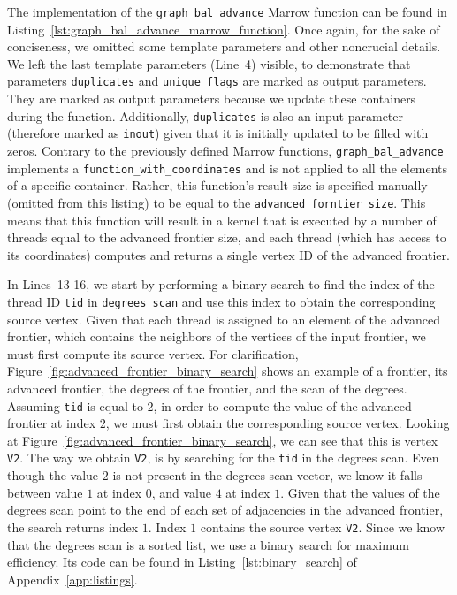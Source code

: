 The implementation of the \texttt{graph\_bal\_advance} Marrow function can be found in Listing~\ref{lst:graph_bal_advance_marrow_function}. Once again, for the sake of conciseness, we omitted some template parameters and other noncrucial details. We left the last template parameters (Line~4) visible, to demonstrate that parameters \texttt{duplicates} and \texttt{unique\_flags} are marked as output parameters. They are marked as output parameters because we update these containers during the function. Additionally, \texttt{duplicates} is also an input parameter (therefore marked as \texttt{inout}) given that it is initially updated to be filled with zeros. Contrary to the previously defined Marrow functions, \texttt{graph\_bal\_advance} implements a \texttt{function\_with\_coordinates} and is not applied to all the elements of a specific container. Rather, this function's result size is specified manually (omitted from this listing) to be equal to the \texttt{advanced\_forntier\_size}. This means that this function will result in a kernel that is executed by a number of threads equal to the advanced frontier size, and each thread (which has access to its coordinates) computes and returns a single vertex ID of the advanced frontier. 

In Lines~13-16, we start by performing a binary search to find the index of the thread ID \texttt{tid} in \texttt{degrees\_scan} and use this index to obtain the corresponding source vertex. Given that each thread is assigned to an element of the advanced frontier, which contains the neighbors of the vertices of the input frontier, we must first compute its source vertex. For clarification, Figure~\ref{fig:advanced_frontier_binary_search} shows an example of a frontier, its advanced frontier, the degrees of the frontier, and the scan of the degrees. Assuming \texttt{tid} is equal to $2$, in order to compute the value of the advanced frontier at index $2$, we must first obtain the corresponding source vertex. Looking at Figure~\ref{fig:advanced_frontier_binary_search}, we can see that this is vertex \texttt{V2}. The way we obtain \texttt{V2}, is by searching for the \texttt{tid} in the degrees scan. Even though the value $2$ is not present in the degrees scan vector, we know it falls between value $1$ at index $0$, and value $4$ at index $1$. Given that the values of the degrees scan point to the end of each set of adjacencies in the advanced frontier, the search returns index $1$. Index $1$ contains the source vertex \texttt{V2}. Since we know that the degrees scan is a sorted list, we use a binary search for maximum efficiency. Its code can be found in Listing~\ref{lst:binary_search} of Appendix~\ref{app:listings}.

